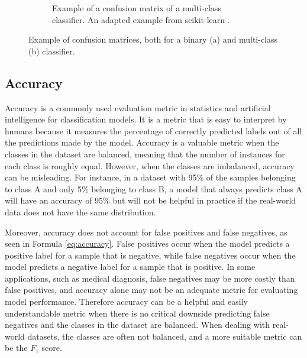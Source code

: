 \begin{figure}[htb]
{\begin{subfigure}[b]{0.5\textwidth}
             \caption{Example of a confusion matrix of a multi-class classifier. An adapted example from scikit-learn \cite{ConfusionMatrix}.}
             \label{fig:confusion_multi}
         \end{subfigure}
         }
        \caption{Example of confusion matrices, both for a binary (a) and multi-class (b) classifier.%
        }
        \label{fig:confusion_matrices}
    \end{figure}


    \subsection{Accuracy}

    Accuracy is a commonly used evaluation metric in statistics and artificial intelligence for classification models. It is a metric that is easy to interpret by humans because it measures the percentage of correctly predicted labels out of all the predictions made by the model. Accuracy is a valuable metric when the classes in the dataset are balanced, meaning that the number of instances for each class is roughly equal. However, when the classes are imbalanced, accuracy can be misleading. For instance, in a dataset with 95\% of the samples belonging to class A and only 5\% belonging to class B, a model that always predicts class A will have an accuracy of 95\% but will not be helpful in practice if the real-world data does not have the same distribution.

    Moreover, accuracy does not account for false positives and false negatives, as seen in Formula \ref{eq:accuracy}. False positives occur when the model predicts a positive label for a sample that is negative, while false negatives occur when the model predicts a negative label for a sample that is positive. In some applications, such as medical diagnosis, false negatives may be more costly than false positives, and accuracy alone may not be an adequate metric for evaluating model performance. Therefore accuracy can be a helpful and easily understandable metric when there is no critical downside predicting false negatives and the classes in the dataset are balanced. When dealing with real-world datasets, the classes are often not balanced, and a more suitable metric can be the $F_1$ score.
    


